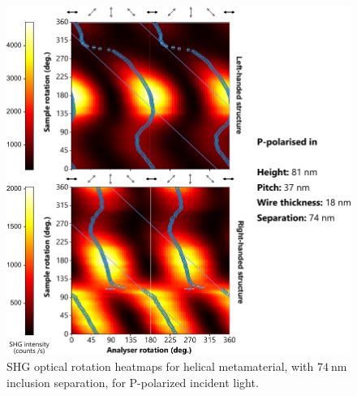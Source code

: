 \begin{figure}[htb!]	
    \centering	
    \includegraphics[scale=1]{./figures/results/OAinPlanarNanohelices/b_p_data.pdf}

    \caption{\label{fig:results:OAinPlanarNanohelices:b_p_data}
    SHG optical rotation heatmaps for helical metamaterial, with $\SI{74}{\nano\m}$ inclusion separation, for P-polarized incident light.}	
\end{figure}

